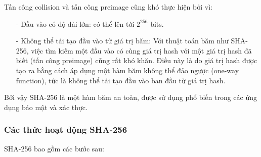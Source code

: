 Tấn công collision và tấn công preimage cũng khó thực hiện bởi vì:
\begin{itemize}
    \item[-] Đầu vào có độ dài lớn: có thể lên tới $2^{256}$ bits.
    \item[-] Không thể tái tạo đầu vào từ giá trị băm: Với thuật toán băm như SHA-256, việc tìm kiếm một đầu vào có cùng giá trị hash với một giá trị hash đã biết (tấn công preimage) cũng rất khó khăn. Điều này là do giá trị hash được tạo ra bằng cách áp dụng một hàm băm không thể đảo ngược (one-way function), tức là không thể tái tạo đầu vào ban đầu từ giá trị hash.
\end{itemize}

Bởi vậy SHA-256 là một hàm băm an toàn, được sử dụng phổ biến trong các ứng dụng bảo mật và xác thực.

\subsubsection{Các thức hoạt động SHA-256}
SHA-256 bao gồm các bước sau:\cite{VIBLO}

